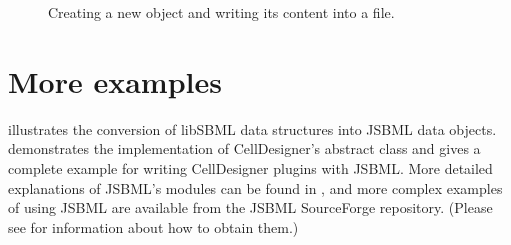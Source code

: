 \begin{figure}[bht]
  \vspace*{-1ex}
  \vspace*{-1.5ex}
  \caption{Creating a new  object and writing its content
    into a file.}
  \label{fig:JSBMLexample-source}
\end{figure}


\section{More examples}

 illustrates the conversion of libSBML data structures
into JSBML data objects.  demonstrates the
implementation of CellDesigner's abstract class  and
 gives a complete example for writing CellDesigner plugins
with JSBML.   More detailed explanations of JSBML's
modules can be found in , and more complex
examples of using JSBML are available from the JSBML SourceForge repository.
(Please see  for information about how to obtain
them.)
